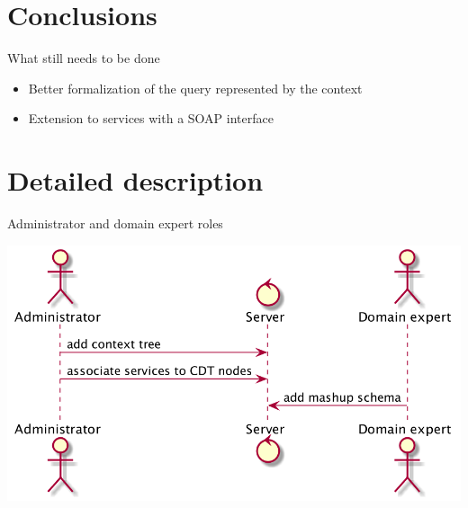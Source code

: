 \documentclass[smaller]{beamer}
\begin{document}
\section{Conclusions}
\label{sec:orgheadline30}
\begin{frame}[label={sec:orgheadline29}]{What still needs to be done}
\begin{itemize}
\item Better formalization of the query represented by the context

\item Extension to services with a SOAP interface
\end{itemize}
\end{frame}


\section{Detailed description}
\label{sec:orgheadline32}
\begin{frame}[label={sec:orgheadline31}]{Administrator and domain expert roles}
\begin{center}
\includegraphics[width=.9\linewidth]{images/designtime.png}
\end{center}
\end{frame}
\end{document}
